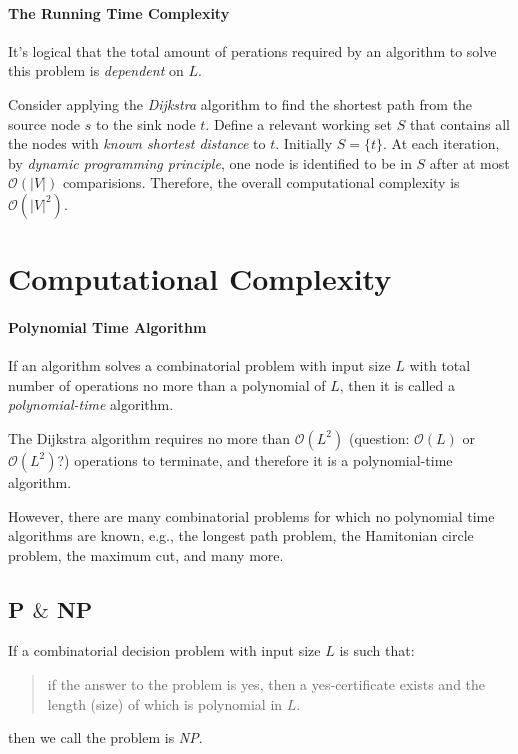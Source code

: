 \paragraph{The Running Time Complexity}
It's logical that the total amount of perations required by an algorithm to solve this problem is \emph{dependent} on $L$.

Consider applying the \emph{Dijkstra} algorithm to find the shortest path from the source node $s$ to the sink node $t$. 
Define a relevant working set $S$ that contains all the nodes with \emph{known shortest distance} to $t$. Initially $S=\{t\}$.
At each iteration, by \emph{dynamic programming principle}, one node is identified to be in $S$ after at most $\mathcal{O}(|V|)$ comparisions. 
Therefore, the overall computational complexity is $\mathcal{O}(|V|^2)$.

\section{Computational Complexity}
\paragraph{Polynomial Time Algorithm}
If an algorithm solves a combinatorial problem with input size $L$ with total number of operations no more than a polynomial of $L$, then it is called a \emph{polynomial-time} algorithm.

The Dijkstra algorithm requires no more than $\mathcal{O}(L^2)$ (question: $\mathcal{O}(L)$ or $\mathcal{O}(L^2)$?) operations to terminate, and therefore it is a polynomial-time algorithm. 

However, there are many combinatorial problems for which no polynomial time algorithms are known, e.g., the longest path problem, the Hamitonian circle problem, the maximum cut, and many more.

\subsection{P $\&$ NP}
\begin{definition}[NP problem]
If a combinatorial decision problem with input size $L$ is such that:
\begin{quotation}
if the answer to the problem is yes, then a yes-certificate exists and the length (size) of which is polynomial in $L$.
\end{quotation}
then we call the problem is \emph{NP}.
\end{definition}

